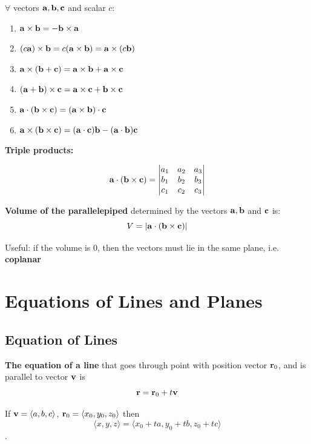 \documentclass{report}
\begin{document}
\begin{tcolorbox}[colback=red!5!white, colframe=red!75!black, title=Properties of the Cross Product]
$\forall$ vectors $\mathbf{a}, \mathbf{b}, \mathbf{c}$ and scalar $c$:
\begin{enumerate}
    \item $\mathbf{a} \times \mathbf{b} = - \mathbf{b} \times \mathbf{a}$
    \item $(c \mathbf{a}) \times \mathbf{b} = c(\mathbf{a} \times \mathbf{b}) = \mathbf{a} \times (c \mathbf{b})$
    \item $\mathbf{a} \times (\mathbf{b} + \mathbf{c}) = \mathbf{a} \times \mathbf{b} + \mathbf{a} \times \mathbf{c}$
    \item $(\mathbf{a} + \mathbf{b}) \times \mathbf{c} = \mathbf{a} \times \mathbf{c} + \mathbf{b} \times \mathbf{c}$
    \item $\mathbf{a} \cdot (\mathbf{b} \times \mathbf{c}) = (\mathbf{a} \times \mathbf{b}) \cdot \mathbf{c}$
    \item $\mathbf{a} \times (\mathbf{b} \times \mathbf{c}) = (\mathbf{a} \cdot \mathbf{c}) \mathbf{b} - (\mathbf{a} \cdot \mathbf{b}) \mathbf{c}$
\end{enumerate}
\end{tcolorbox}

\textbf{Triple products:}

\[\mathbf{a} \cdot (\mathbf{b} \times \mathbf{c}) = \begin{vmatrix}
    a_1 & a_2 & a_3 \\
    b_1 & b_2 & b_3 \\
    c_1 & c_2 & c_3 \\
\end{vmatrix}\]


\textbf{Volume of the parallelepiped} determined by the vectors $\mathbf{a}, \mathbf{b}$ and $\mathbf{c}$
is:
\[V = |\mathbf{a} \cdot (\mathbf{b} \times \mathbf{c})|\]

Useful: if the volume is 0, then the vectors must lie in the same plane, i.e. \textbf{coplanar}

\section{Equations of Lines and Planes}

\subsection{Equation of Lines}

\textbf{The equation of a line} that goes through point with position vector $\mathbf{r}_0$, 
and is parallel to vector $\mathbf{v}$ is \[
\mathbf{r} = \mathbf{r}_0 + t \mathbf{v}
\]

If $\mathbf{v} = \langle a, b, c\rangle$, $\mathbf{r}_0 = \langle x_0, y_0, z_0 \rangle$ then 
\[
\langle x, y, z\rangle =  \langle x_0 + t a, y_0 + t b, z_0 + t c\rangle
\].
\end{document}

